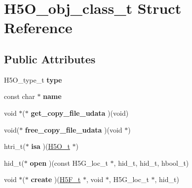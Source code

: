 \hypertarget{struct_h5_o__obj__class__t}{}\section{H5\+O\+\_\+obj\+\_\+class\+\_\+t Struct Reference}
\label{struct_h5_o__obj__class__t}
\subsection*{Public Attributes}
\begin{DoxyCompactItemize}
\item 
\mbox{\label{struct_h5_o__obj__class__t_a2881c69c6fb56b90f4cc0fb80832ae5b}} 
H5\+O\+\_\+type\+\_\+t {\bfseries type}
\item 
\mbox{\label{struct_h5_o__obj__class__t_a30c18f35f32365d63aa8168e1cc2ee20}} 
const char $\ast$ {\bfseries name}
\item 
\mbox{\label{struct_h5_o__obj__class__t_afe9de72d1320d04833af45a9794bb1b1}} 
void $\ast$($\ast$ {\bfseries get\+\_\+copy\+\_\+file\+\_\+udata} )(void)
\item 
\mbox{\label{struct_h5_o__obj__class__t_a24999f14c992017c94f46186b27eb473}} 
void($\ast$ {\bfseries free\+\_\+copy\+\_\+file\+\_\+udata} )(void $\ast$)
\item 
\mbox{\label{struct_h5_o__obj__class__t_a0df03985a28edbd046c15cfeb8c22a38}} 
htri\+\_\+t($\ast$ {\bfseries isa} )(\hyperlink{struct_h5_o__t}{H5\+O\+\_\+t} $\ast$)
\item 
\mbox{\label{struct_h5_o__obj__class__t_a5dac61eb6f0ad5fe6ca98f9ba0763e01}} 
hid\+\_\+t($\ast$ {\bfseries open} )(const H5\+G\+\_\+loc\+\_\+t $\ast$, hid\+\_\+t, hid\+\_\+t, hbool\+\_\+t)
\item 
\mbox{\label{struct_h5_o__obj__class__t_a96726e38d8596b8fb6870e4514ad4761}} 
void $\ast$($\ast$ {\bfseries create} )(\hyperlink{struct_h5_f__t}{H5\+F\+\_\+t} $\ast$, void $\ast$, H5\+G\+\_\+loc\+\_\+t $\ast$, hid\+\_\+t)
\item 

\end{DoxyCompactItemize}
